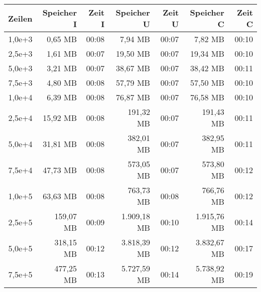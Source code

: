 \begin{table}
    \centering
    \begin{tabular}{|r|r|r|r|r|r|r|}
        \hline
        \textbf{Zeilen} & \textbf{Speicher I} & \textbf{Zeit I} & \textbf{Speicher U} & \textbf{Zeit U} & \textbf{Speicher C} & \textbf{Zeit C} \\ \hline
        1,0e+3          & 0,65 MB             & 00:08           & 7,94 MB             & 00:07           & 7,82 MB             & 00:10           \\ \hline
        2,5e+3          & 1,61 MB             & 00:07           & 19,50 MB            & 00:07           & 19,34 MB            & 00:10           \\ \hline
        5,0e+3          & 3,21 MB             & 00:07           & 38,67 MB            & 00:07           & 38,42 MB            & 00:11           \\ \hline
        7,5e+3          & 4,80 MB             & 00:08           & 57,79 MB            & 00:07           & 57,50 MB            & 00:10           \\ \hline
        1,0e+4          & 6,39 MB             & 00:08           & 76,87 MB            & 00:07           & 76,58 MB            & 00:10           \\ \hline
        2,5e+4          & 15,92 MB            & 00:08           & 191,32 MB           & 00:07           & 191,43 MB           & 00:11           \\ \hline
        5,0e+4          & 31,81 MB            & 00:08           & 382,01 MB           & 00:07           & 382,95 MB           & 00:11           \\ \hline
        7,5e+4          & 47,73 MB            & 00:08           & 573,05 MB           & 00:07           & 573,80 MB           & 00:12           \\ \hline
        1,0e+5          & 63,63 MB            & 00:08           & 763,73 MB           & 00:08           & 766,76 MB           & 00:12           \\ \hline
        2,5e+5          & 159,07 MB           & 00:09           & 1.909,18 MB         & 00:10           & 1.915,76 MB         & 00:14           \\ \hline
        5,0e+5          & 318,15 MB           & 00:12           & 3.818,39 MB         & 00:12           & 3.832,67 MB         & 00:17           \\ \hline
        7,5e+5          & 477,25 MB           & 00:13           & 5.727,59 MB         & 00:14           & 5.738,92 MB         & 00:19           \\ \hline

\end{tabular}
\end{table}
